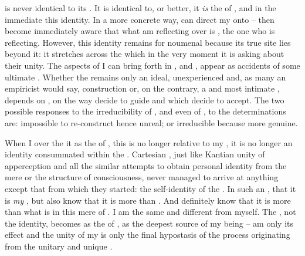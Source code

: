 \pa\label{pa:usedBuber}  is never identical to its .
It is identical to, or better, it {\em is} the  of , and
in the immediate    this identity.  In a
more concrete way,  can direct my  onto  -- then
 become immediately aware that what  am reflecting over is ,
the one who is reflecting.  However, this identity remains for
 noumenal because its true site lies beyond it: it stretches
across the  which  in the very moment
it is asking about their unity.  The aspects of  I can bring forth in
,  and ,
appear as accidents of some ultimate .  Whether the  remains
only an ideal, unexperienced and, as many an empiricist would say, 
construction or, on the contrary, a  and most intimate
, depends on , on the way  decide to guide  and which   decide to accept. The two possible
responses to the  irreducibility of , and even of
, to the  determinations are: impossible to
re-construct hence unreal; or irreducible because more genuine.

When I  over the   it as the
 of  , this  is no longer relative to
my , it is no longer an  identity consummated
within the \hoa.  Cartesian , just like Kantian unity of apperception
and all the similar attempts to obtain personal identity from the mere 
or the structure of  consciousness, never managed to arrive at
anything except that from which they started: the  self-identity
of the .  In such an ,  
that it is {\em my} , but  also know that it is more than
.  And  definitely know that it is more than what is
 in this mere  of .  I am the same
and different from myself.  The , not the identity, becomes
 as the  of , as the deepest source of my
being --  am only its  effect and the unity of my  is
only the final hypostasis of the  process originating from the
unitary and unique .

